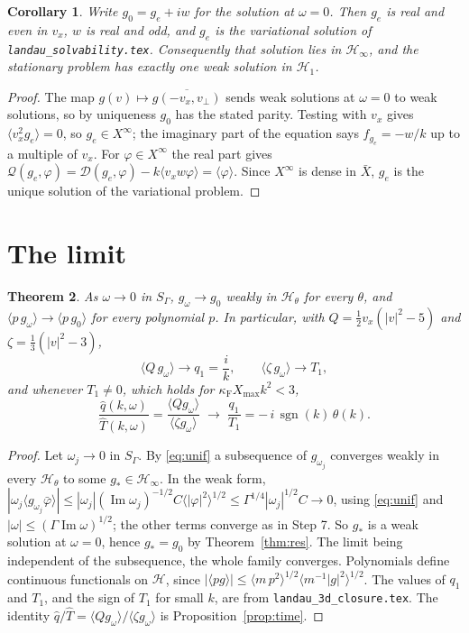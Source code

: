 \documentclass[11pt]{article}
\newcommand{\cD}{\mathcal{D}}
\newcommand{\cH}{\mathcal{H}}
\newcommand{\cQ}{\mathcal{Q}}
\newcommand{\avg}[1]{\langle #1\rangle}
\renewcommand{\Im}{\operatorname{Im}}
\newtheorem{theorem}{Theorem}
\newtheorem{corollary}[theorem]{Corollary}
\theoremstyle{remark}
\begin{document}
\begin{corollary}\label{cor:stat}
Write $g_0=g_e+iw$ for the solution at $\omega=0$. Then $g_e$ is real and
even in $v_x$, $w$ is real and odd, and $g_e$ is the variational solution of
\texttt{landau\_solvability.tex}. Consequently that solution lies in
$\cH_\infty$, and the stationary problem has exactly one weak solution in
$\cH_1$.
\end{corollary}

\begin{proof}
The map $g(v)\mapsto\overline{g(-v_x,v_\perp)}$ sends weak solutions at
$\omega=0$ to weak solutions, so by uniqueness $g_0$ has the stated parity.
Testing with $v_x$ gives $\avg{v_x^2g_e}=0$, so $g_e\in X^\infty$; the
imaginary part of the equation says $f_{g_e}=-w/k$ up to a multiple of
$v_x$. For $\varphi\in X^\infty$ the real part gives
$\cQ(g_e,\varphi)=\cD(g_e,\varphi)-k\avg{v_xw\varphi}=\avg{\varphi}$. Since
$X^\infty$ is dense in $\bar X$, $g_e$ is the unique solution of the
variational problem.
\end{proof}

\section{The limit}

\begin{theorem}\label{thm:limit}
As $\omega\to0$ in $S_\Gamma$, $g_\omega\to g_0$ weakly in $\cH_\theta$ for
every $\theta$, and $\avg{p\,g_\omega}\to\avg{p\,g_0}$ for every polynomial
$p$. In particular, with $Q=\tfrac12v_x(|v|^2-5)$ and
$\zeta=\tfrac13(|v|^2-3)$,
\[
  \avg{Q\,g_\omega}\to q_1=\frac{i}{k},\qquad
  \avg{\zeta\,g_\omega}\to T_1 ,
\]
and whenever $T_1\ne0$, which holds for
$\kappa_{\mathrm F}X_{\max}k^2<3$,
\[
  \frac{\hat q(k,\omega)}{\hat T(k,\omega)}
  =\frac{\avg{Qg_\omega}}{\avg{\zeta g_\omega}}\;\longrightarrow\;
  \frac{q_1}{T_1}=-\,i\,\operatorname{sgn}(k)\,\theta(k).
\]
\end{theorem}

\begin{proof}
Let $\omega_j\to0$ in $S_\Gamma$. By \eqref{eq:unif} a subsequence of
$g_{\omega_j}$ converges weakly in every $\cH_\theta$ to some
$g_*\in\cH_\infty$. In the weak form, $|\omega_j\avg{g_{\omega_j}\bar\varphi}|
\le|\omega_j|(\Im\omega_j)^{-1/2}C\avg{|\varphi|^2}^{1/2}
\le\Gamma^{1/4}|\omega_j|^{1/2}C\to0$, using \eqref{eq:unif} and
$|\omega|\le(\Gamma\Im\omega)^{1/2}$; the other terms converge as in Step 7.
So $g_*$ is a weak solution at $\omega=0$, hence $g_*=g_0$ by
Theorem~\ref{thm:res}. The limit being independent of the subsequence, the
whole family converges. Polynomials define continuous functionals on $\cH$,
since $|\avg{pg}|\le\avg{m\,p^2}^{1/2}\avg{m^{-1}|g|^2}^{1/2}$. The values of
$q_1$ and $T_1$, and the sign of $T_1$ for small $k$, are from
\texttt{landau\_3d\_closure.tex}. The identity
$\hat q/\hat T=\avg{Qg_\omega}/\avg{\zeta g_\omega}$ is
Proposition~\ref{prop:time}.
\end{proof}
\end{document}
